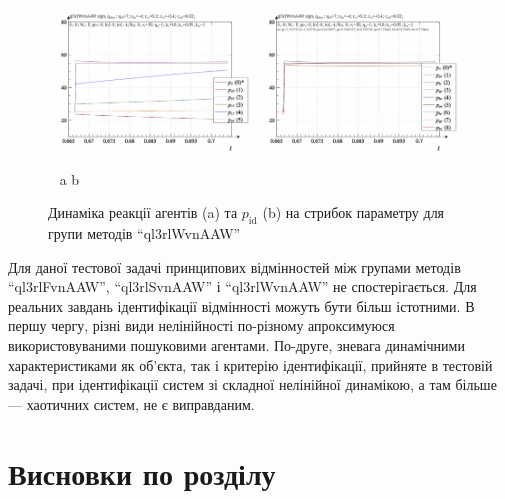 \begin{figure}[htb!]
  \begin{center}
    \includegraphics[width=0.48\textwidth]{p/sign/qls-p_t_pi_m_ql3rlWvnAAW_sign.png}
    \hfill
    \includegraphics[width=0.48\textwidth]{p/sign/qls-p_t_p_m_ql3rlWvnAAW_sign.png}
  \end{center}
  \vspace{-1.0ex}
  \begin{center}
    ~ \hfill a \hfill\hfill b  \hfill ~
  \end{center}
  \vspace{-1.5ex}
  \caption{Динаміка реакції агентів (a) та $p_\mathrm{id}$ (b) на стрибок параметру для групи методів ``ql3rlWvnAAW''}
  \label{atu:f:ql3rlWvnAAW_sign}
\end{figure}

Для даної тестової задачі принципових відмінностей між групами методів
``ql3rlFvnAAW'', ``ql3rlSvnAAW'' і ``ql3rlWvnAAW'' не спостерігається. Для
реальних завдань ідентифікації відмінності можуть бути більш істотними.
%
В першу чергу, різні види нелінійності по-різному
апроксимуюся використовуваними пошуковими
агентами. По-друге, зневага динамічними характеристиками як
об'єкта, так і критерію ідентифікації, прийняте в тестовій
задачі, при ідентифікації систем зі складної нелінійної
динамікою, а там більше --- хаотичних систем, не є виправданим.





\section{Висновки по розділу \thechapter} %


